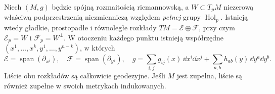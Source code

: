 \begin{twierdzenie}
\label{thm:holonomia-lokalny-produkt}
Niech $(M,g)$ będzie spójną rozmaitością riemannowską,
a $W\subset T_pM$ niezerową właściwą
podprzestrzenią niezmienniczą względem \emph{pełnej}
grupy $\operatorname{Hol}_p$. Istnieją wtedy gładkie,
prostopadłe i równoległe rozkłady
$TM=\mathcal E\oplus\mathcal F$, przy czym
$\mathcal E_p=W$ i $\mathcal F_p=W^\perp$.
W otoczeniu każdego punktu istnieją współrzędne
$(x^1,\ldots,x^k,y^1,\ldots,y^{n-k})$, w których
\begin{equation}\label{eq:holonomia-lokalny-produkt}
 \mathcal E=\operatorname{span}(\partial_{x^i}),\quad
 \mathcal F=\operatorname{span}(\partial_{y^a}),\quad
 g=\sum_{i,j}g_{ij}(x)\,\dd x^i\dd x^j
   +\sum_{a,b}h_{ab}(y)\,\dd y^a\dd y^b.
\end{equation}
Liście obu rozkładów są całkowicie geodezyjne.
Jeśli $M$ jest zupełna, liście są również zupełne
w swoich metrykach indukowanych.
\end{twierdzenie}
